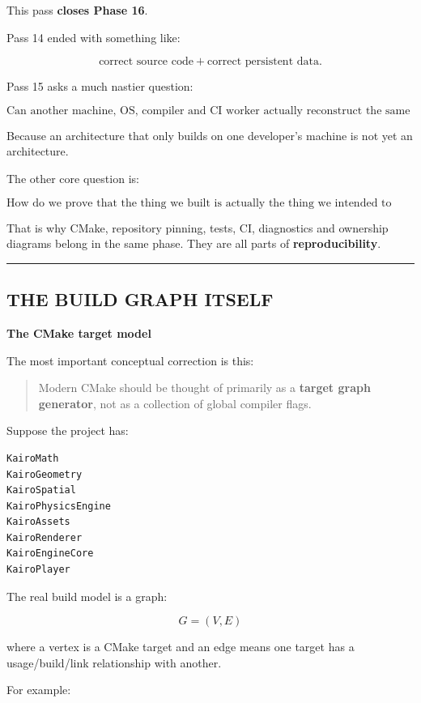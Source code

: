This pass \textbf{closes Phase 16}.

Pass 14 ended with something like:

\[
\text{correct source code}
+
\text{correct persistent data}.
\]

Pass 15 asks a much nastier question:

\[
\boxed{
\text{Can another machine, OS, compiler and CI worker actually reconstruct the same engine correctly?}
}
\]

Because an architecture that only builds on one developer's machine is not yet an architecture.

The other core question is:

\[
\boxed{
\text{How do we prove that the thing we built is actually the thing we intended to build?}
}
\]

That is why CMake, repository pinning, tests, CI, diagnostics and ownership diagrams belong in the same phase. They are all parts of \textbf{reproducibility}.

\begin{center}\rule{0.5\linewidth}{0.5pt}\end{center}

\subsection{THE BUILD GRAPH ITSELF}\label{03-visual-computing-i-ch017-the-build-graph-itself}

\textbf{The CMake target model}

The most important conceptual correction is this:

\begin{quote}
Modern CMake should be thought of primarily as a \textbf{target graph generator}, not as a collection of global compiler flags.
\end{quote}

Suppose the project has:

\begin{verbatim}
KairoMath
KairoGeometry
KairoSpatial
KairoPhysicsEngine
KairoAssets
KairoRenderer
KairoEngineCore
KairoPlayer
\end{verbatim}

The real build model is a graph:

\[
G=(V,E)
\]

where a vertex is a CMake target and an edge means one target has a usage/build/link relationship with another.

For example:

